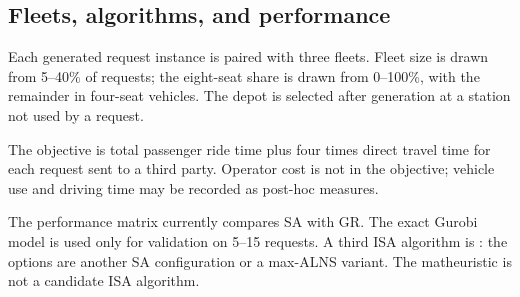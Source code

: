\subsection{Fleets, algorithms, and performance}

Each generated request instance is paired with three fleets. Fleet size is
drawn from 5--40\% of requests; the eight-seat share is drawn from 0--100\%,
with the remainder in four-seat vehicles. The depot is selected after
generation at a station not used by a request.

The objective is total passenger ride time plus four times direct travel time
for each request sent to a third party. Operator cost is not in the objective;
vehicle use and driving time may be recorded as post-hoc measures.

The performance matrix currently compares SA with GR. The exact Gurobi model
is used only for validation on 5--15 requests. A third ISA algorithm is
\tagopen: the options are another SA configuration or a max-ALNS variant. The
matheuristic is not a candidate ISA algorithm.
